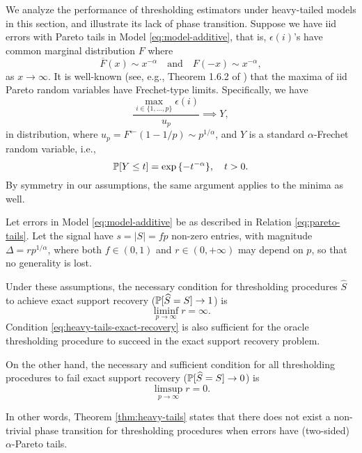We analyze the performance of thresholding estimators under heavy-tailed models in this section, and illustrate its lack of phase transition.
Suppose we have iid errors with Pareto tails in Model \eqref{eq:model-additive}, that is, $\epsilon(i)$'s have common marginal distribution $F$ where
\begin{equation} \label{eq:pareto-tails}
    \overline{F}(x) \sim x^{-\alpha} \quad \text{and} \quad F(-x) \sim x^{-\alpha},    
\end{equation}
as $x\to\infty$. 
It is well-known (see, e.g., Theorem 1.6.2 of \citep{leadbetter2012extremes}) that the maxima of iid Pareto random variables have Frechet-type limits.
Specifically, we have
\begin{equation} \label{eq:Frechet-limit-1}
    \frac{\max_{i\in\{1,\ldots,p\}}\epsilon(i)}{u_p} \implies Y,
\end{equation}
in distribution, where $u_p = F^{\leftarrow}(1-1/p)\sim p^{1/\alpha}$, and $Y$ is a standard $\alpha$-Frechet random variable, i.e.,
\begin{equation*}
    \P[Y\le t] = \exp{\{-t^{-\alpha}\}}, \quad t>0.
\end{equation*}
By symmetry in our assumptions, the same argument applies to the minima as well.

\begin{theorem} \label{thm:heavy-tails}
Let errors in Model \eqref{eq:model-additive} be as described in Relation \eqref{eq:pareto-tails}.
Let the signal have $s = |S| = fp$ non-zero entries, with magnitude $\Delta = rp^{1/\alpha}$, where both $f\in(0,1)$ and $r\in(0,+\infty)$ may depend on $p$, so that no generality is lost.

Under these assumptions, the necessary condition for thresholding procedures $\widehat{S}$ to achieve exact support recovery ($\P[\widehat{S}=S]\to1$) is 
\begin{equation} \label{eq:heavy-tails-exact-recovery}
    \liminf_{p\to\infty} r = \infty.
\end{equation}
Condition \eqref{eq:heavy-tails-exact-recovery} is also sufficient for the oracle thresholding procedure to succeed in the exact support recovery problem.

On the other hand, the necessary and sufficient condition for all thresholding procedures to fail exact support recovery ($\P[\widehat{S}=S]\to0$) is 
$$
\limsup_{p\to\infty} r = 0.
$$
\end{theorem}

In other words, Theorem \ref{thm:heavy-tails} states that there does not exist a non-trivial phase transition for thresholding procedures when errors have (two-sided) $\alpha$-Pareto tails.


